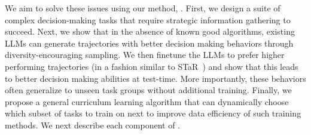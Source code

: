We aim to solve these issues using our method, \ours{}. First, we design a suite of complex decision-making tasks that require strategic information gathering to succeed. Next, we show that in the absence of known good algorithms, existing LLMs can generate trajectories with better decision making behaviors through diversity-encouraging sampling. We then finetune the LLMs to prefer higher performing trajectories (in a fashion similar to STaR~\citep{zelikman2022starbootstrappingreasoningreasoning}) and show that this leads to better decision making abilities at test-time. More importantly, these behaviors often generalize to unseen task groups without additional training. Finally, we propose a general curriculum learning algorithm that can dynamically choose which subset of tasks to train on next to improve data efficiency of such training methods. We next describe each component of \ours{}.





